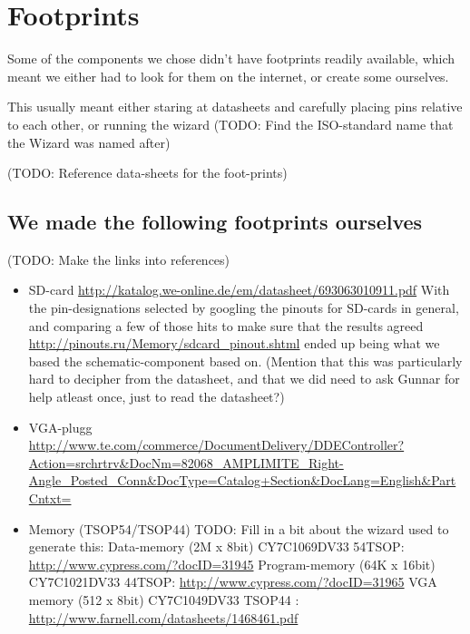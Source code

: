 \section {Footprints}
Some of the components we chose didn't have footprints readily available,
which meant we either had to look for them on the internet, or create some
ourselves.

This usually meant either staring at datasheets and carefully placing pins relative
to each other, or running the wizard (TODO: Find the ISO-standard name that the Wizard was
named after)

(TODO: Reference data-sheets for the foot-prints)

\subsection {We made the following footprints ourselves}
(TODO: Make the links into references)
\begin {itemize}
\item SD-card \url{http://katalog.we-online.de/em/datasheet/693063010911.pdf}
With the pin-designations selected by googling the pinouts for SD-cards in general, and
comparing a few of those hits to make sure that the results agreed \url{http://pinouts.ru/Memory/sdcard_pinout.shtml}
ended up being what we based the schematic-component based on. (Mention that this was
particularly hard to decipher from the datasheet, and that we did need to ask Gunnar for
help atleast once, just to read the datasheet?)
\item VGA-plugg \url{http://www.te.com/commerce/DocumentDelivery/DDEController?Action=srchrtrv&DocNm=82068_AMPLIMITE_Right-Angle_Posted_Conn&DocType=Catalog+Section&DocLang=English&PartCntxt=}
\item Memory (TSOP54/TSOP44)
TODO: Fill in a bit about the wizard used to generate this:
Data-memory (2M x 8bit) CY7C1069DV33  54TSOP: \url{http://www.cypress.com/?docID=31945}
Program-memory (64K x 16bit) CY7C1021DV33  44TSOP: \url{http://www.cypress.com/?docID=31965}
VGA memory (512 x 8bit) CY7C1049DV33 TSOP44 : \url{http://www.farnell.com/datasheets/1468461.pdf}
\end {itemize}

